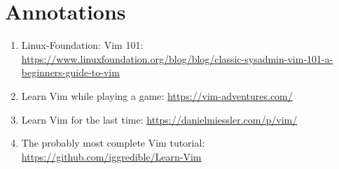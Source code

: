 \documentclass{dcbl/challenge}
\begin{document}
\section*{Annotations}
\begin{enumerate}
    \item Linux-Foundation: Vim 101: \\\url{https://www.linuxfoundation.org/blog/blog/classic-sysadmin-vim-101-a-beginners-guide-to-vim}
    \item Learn Vim while playing a game: \url{https://vim-adventures.com/}
    \item Learn Vim for the last time: \url{https://danielmiessler.com/p/vim/}
    \item The probably most complete Vim tutorial: \url{https://github.com/iggredible/Learn-Vim}
\end{enumerate}
\end{document}
